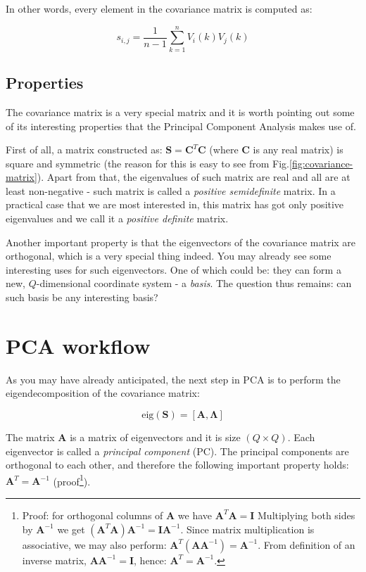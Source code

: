 \documentclass[10pt,twocolumn]{article}
\begin{document}
In other words, every element in the covariance matrix is computed as:

\begin{equation}
s_{i,j} = \frac{1}{n-1} \sum\limits_{k=1}^n V_i(k) V_j(k)
\end{equation}

\subsection{Properties}

The covariance matrix is a very special matrix and it is worth pointing out some of its interesting properties that the Principal Component Analysis makes use of.

First of all, a matrix constructed as: $\bm{S} = \bm{C}^T \bm{C}$ (where $\bm{C}$ is any real matrix) is square and symmetric (the reason for this is easy to see from Fig.\ref{fig:covariance-matrix}). Apart from that, the eigenvalues of such matrix are real and all are at least non-negative - such matrix is called a \textit{positive semidefinite} matrix. In a practical case that we are most interested in, this matrix has got only positive eigenvalues and we call it a \textit{positive definite} matrix.

Another important property is that the eigenvectors of the covariance matrix are orthogonal, which is a very special thing indeed. You may already see some interesting uses for such eigenvectors. One of which could be: they can form a new, $Q$-dimensional coordinate system - a \textit{basis}. The question thus remains: can such basis be any interesting basis?

\section{PCA workflow}

As you may have already anticipated, the next step in PCA is to perform the eigendecomposition of the covariance matrix:

\begin{equation} \label{eq:eig-dec}
\text{eig}(\bm{S}) = [\bm{A}, \bm{\Lambda}]
\end{equation}

The matrix $\bm{A}$ is a matrix of eigenvectors and it is size $(Q \times Q)$. Each eigenvector is called a \textit{principal component} (PC). The principal components are orthogonal to each other, and therefore the following important property holds: $\bm{A}^T = \bm{A}^{-1}$ (proof\footnote{Proof: for orthogonal columns of $\bm{A}$ we have $\bm{A}^T \bm{A} = \bm{I}$ Multiplying both sides by $\bm{A}^{-1}$ we get $(\bm{A}^T \bm{A}) \bm{A}^{-1}= \bm{I}\bm{A}^{-1}$. Since matrix multiplication is associative, we may also perform: $\bm{A}^T (\bm{A} \bm{A}^{-1}) = \bm{A}^{-1}$. From definition of an inverse matrix,  $\bm{A} \bm{A}^{-1} = \bm{I}$, hence: $\bm{A}^T = \bm{A}^{-1}$.}).
\end{document}
